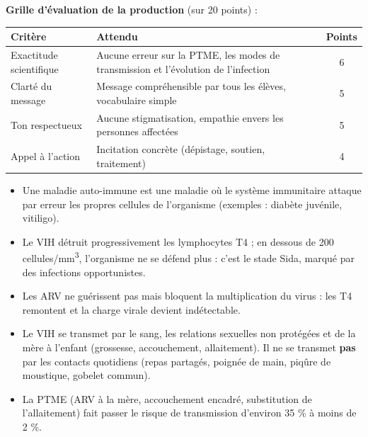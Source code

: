 \documentclass[11pt]{article}
\newcommand{\cle}[1]{{\popxbold\color{popdark}#1}}
\newcounter{popsec}
\newcounter{popsub}
\newcommand{\courssub}[1]{%
  \stepcounter{popsub}%
  \par\vspace{9pt}\noindent{\popxbold\fontsize{11.5}{13}\selectfont\color{popink}{\color{poporange}\thepopsec.\thepopsub}\hspace{6pt}#1}\par\nopagebreak\vspace{4pt}
}
\begin{document}
\textbf{Grille d'évaluation de la production} (sur 20 points) :

\begin{center}
\begin{tabularx}{\linewidth}{|l|X|c|}
\hline
\rowcolor{popblueL} \textbf{Critère} & \textbf{Attendu} & \textbf{Points} \\
\hline
Exactitude scientifique & Aucune erreur sur la PTME, les modes de transmission et l'évolution de l'infection & 6 \\
\hline
Clarté du message & Message compréhensible par tous les élèves, vocabulaire simple & 5 \\
\hline
Ton respectueux & Aucune stigmatisation, empathie envers les personnes affectées & 5 \\
\hline
Appel à l'action & Incitation concrète (dépistage, soutien, traitement) & 4 \\
\hline
\end{tabularx}
\end{center}

\courssub{Ressources à mobiliser}

\begin{aretenir}
\begin{itemize}
\item Une \cle{maladie auto-immune} est une maladie où le système immunitaire attaque par erreur les propres cellules de l'organisme (exemples : diabète juvénile, vitiligo).
\item Le \cle{VIH} détruit progressivement les lymphocytes T4 ; en dessous de 200 cellules/mm\textsuperscript{3}, l'organisme ne se défend plus : c'est le stade \cle{Sida}, marqué par des infections opportunistes.
\item Les \cle{ARV} ne guérissent pas mais bloquent la multiplication du virus : les T4 remontent et la charge virale devient indétectable.
\item Le VIH se transmet par le \cle{sang}, les \cle{relations sexuelles non protégées} et de la \cle{mère à l'enfant} (grossesse, accouchement, allaitement). Il ne se transmet \textbf{pas} par les contacts quotidiens (repas partagés, poignée de main, piqûre de moustique, gobelet commun).
\item La \cle{PTME} (ARV à la mère, accouchement encadré, substitution de l'allaitement) fait passer le risque de transmission d'environ 35 \% à moins de 2 \%.
\end{itemize}
\end{aretenir}
\end{document}
